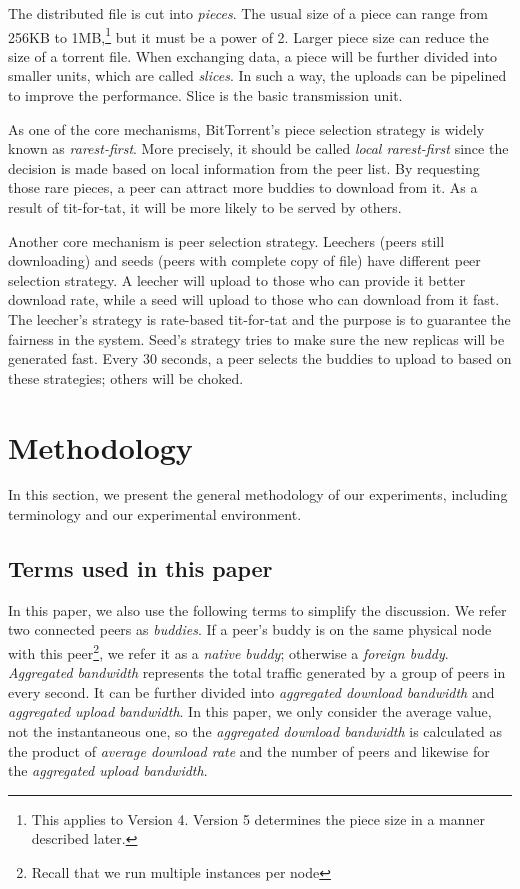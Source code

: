 \documentclass[10pt,letterpaper,twocolumn]{article}
\begin{document}
The distributed file is cut into \textit{pieces}. The usual size of a
piece can range from 256KB to 1MB,\footnote{This applies to Version
  4. Version 5 determines the piece size in a manner described later.}
but it must be a power of 2. Larger piece size can reduce the size of
a torrent file. When exchanging data, a piece will be further divided
into smaller units, which are called \textit{slices}. In such a way,
the uploads can be pipelined to improve the performance. Slice is the
basic transmission unit.

As one of the core mechanisms, BitTorrent's piece selection strategy
is widely known as \textit{rarest-first}. More precisely, it should be
called \textit{local rarest-first} since the decision is made based on
local information from the peer list. By requesting those rare
pieces, a peer can attract more buddies to download from it. As a
result of tit-for-tat, it will be more likely to be served by others.

Another core mechanism is peer selection strategy.  Leechers (peers
still downloading) and seeds (peers with complete copy of file) have
different peer selection strategy. A leecher will upload to those who
can provide it better download rate, while a seed will upload to
those who can download from it fast. The leecher's strategy is
rate-based tit-for-tat and the purpose is to guarantee the fairness in
the system. Seed's strategy tries to make sure the new replicas will
be generated fast.  Every 30 seconds, a peer selects the buddies to
upload to based on these strategies; others will be choked.


\section{Methodology}
\label{methodology}

In this section, we present the general methodology of our
experiments, including terminology and our experimental environment. 

\subsection{Terms used in this paper}
\label{sec:terms-used-this}

In this paper, we also use the following terms to simplify the
discussion. We refer two connected peers as \textit{buddies}. If a
peer's buddy is on the same physical node with this
peer\footnote{Recall that we run multiple instances per node}, we
refer it as a \textit{native buddy}; otherwise a \textit{foreign
  buddy}. \textit{Aggregated bandwidth} represents the total traffic
generated by a group of peers in every second. It can be further
divided into \textit{aggregated download bandwidth} and
\textit{aggregated upload bandwidth}. In this paper, we only consider
the average value, not the instantaneous one, so the
\textit{aggregated download bandwidth} is calculated as the product of
\textit{average download rate} and the number of peers and likewise
for the \textit{aggregated upload bandwidth}.
\end{document}
